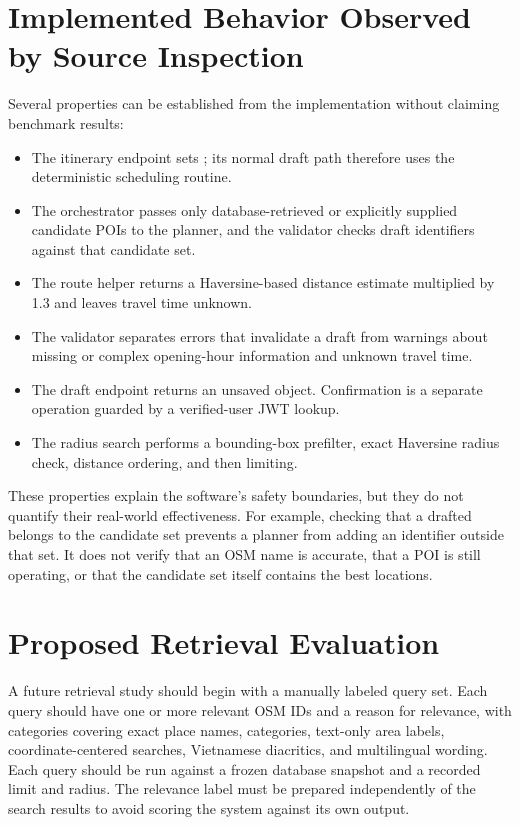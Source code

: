 \section{Implemented Behavior Observed by Source Inspection}

Several properties can be established from the implementation without claiming benchmark results:
\begin{itemize}[leftmargin=1.8em,itemsep=3pt]
    \item The itinerary endpoint sets ; its normal draft path therefore uses the deterministic scheduling routine.
    \item The orchestrator passes only database-retrieved or explicitly supplied candidate POIs to the planner, and the validator checks draft identifiers against that candidate set.
    \item The route helper returns a Haversine-based distance estimate multiplied by 1.3 and leaves travel time unknown.
    \item The validator separates errors that invalidate a draft from warnings about missing or complex opening-hour information and unknown travel time.
    \item The draft endpoint returns an unsaved object. Confirmation is a separate operation guarded by a verified-user JWT lookup.
    \item The radius search performs a bounding-box prefilter, exact Haversine radius check, distance ordering, and then limiting.
\end{itemize}

These properties explain the software's safety boundaries, but they do not quantify their real-world effectiveness. For example, checking that a drafted  belongs to the candidate set prevents a planner from adding an identifier outside that set. It does not verify that an OSM name is accurate, that a POI is still operating, or that the candidate set itself contains the best locations.

\section{Proposed Retrieval Evaluation}

A future retrieval study should begin with a manually labeled query set. Each query should have one or more relevant OSM IDs and a reason for relevance, with categories covering exact place names, categories, text-only area labels, coordinate-centered searches, Vietnamese diacritics, and multilingual wording. Each query should be run against a frozen database snapshot and a recorded limit and radius. The relevance label must be prepared independently of the search results to avoid scoring the system against its own output.

